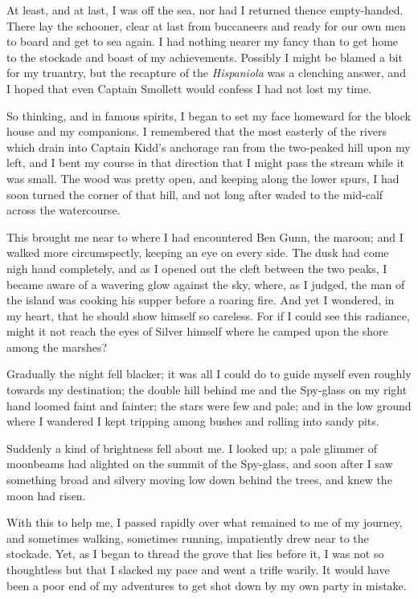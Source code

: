At least, and at last, I was off the sea, nor had I returned thence empty-handed. There lay the schooner, clear at last from buccaneers and ready for our own men to board and get to sea again. I had nothing nearer my fancy than to get home to the stockade and boast of my achievements. Possibly I might be blamed a bit for my truantry, but the recapture of the \textit{Hispaniola} was a clenching answer, and I hoped that even Captain Smollett would confess I had not lost my time.

So thinking, and in famous spirits, I began to set my face homeward for the block house and my companions. I remembered that the most easterly of the rivers which drain into Captain Kidd's anchorage ran from the two-peaked hill upon my left, and I bent my course in that direction that I might pass the stream while it was small. The wood was pretty open, and keeping along the lower spurs, I had soon turned the corner of that hill, and not long after waded to the mid-calf across the watercourse.

This brought me near to where I had encountered Ben Gunn, the maroon; and I walked more circumspectly, keeping an eye on every side. The dusk had come nigh hand completely, and as I opened out the cleft between the two peaks, I became aware of a wavering glow against the sky, where, as I judged, the man of the island was cooking his supper before a roaring fire. And yet I wondered, in my heart, that he should show himself so careless. For if I could see this radiance, might it not reach the eyes of Silver himself where he camped upon the shore among the marshes?

Gradually the night fell blacker; it was all I could do to guide myself even roughly towards my destination; the double hill behind me and the Spy-glass on my right hand loomed faint and fainter; the stars were few and pale; and in the low ground where I wandered I kept tripping among bushes and rolling into sandy pits.

Suddenly a kind of brightness fell about me. I looked up; a pale glimmer of moonbeams had alighted on the summit of the Spy-glass, and soon after I saw something broad and silvery moving low down behind the trees, and knew the moon had risen.

With this to help me, I passed rapidly over what remained to me of my journey, and sometimes walking, sometimes running, impatiently drew near to the stockade. Yet, as I began to thread the grove that lies before it, I was not so thoughtless but that I slacked my pace and went a trifle warily. It would have been a poor end of my adventures to get shot down by my own party in mistake.

